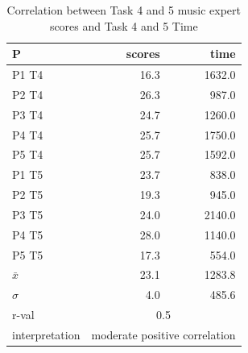 \begin{table}[H]
\centering
\label{C2}
\caption{Correlation between Task 4 and 5 music expert scores and Task 4 and 5 Time}
\begin{tabular}{lrr}
\hline \hline
 P  & scores & time \\ \hline
P1 T4          & 16.3                        & 1632.0                    \\ \hline
P2 T4          & 26.3                        & 987.0                     \\ \hline
P3 T4          & 24.7                        & 1260.0                    \\ \hline
P4 T4          & 25.7                        & 1750.0                    \\ \hline
P5 T4          & 25.7                        & 1592.0                    \\ \hline
P1 T5          & 23.7                        & 838.0                     \\ \hline
P2 T5          & 19.3                        & 945.0                     \\ \hline
P3 T5          & 24.0                        & 2140.0                    \\ \hline
P4 T5          & 28.0                        & 1140.0                    \\ \hline
P5 T5          & 17.3                        & 554.0                     \\ \hline
$\bar{x}$             & 23.1                        & 1283.8                    \\ \hline
$\sigma$       & 4.0                         & 485.6                     \\ \hline
r-val          & \multicolumn{2}{c}{0.5}                                \\ \hline
interpretation & \multicolumn{2}{c}{moderate positive correlation} \\ \hline \hline 
\end{tabular}
\end{table}

